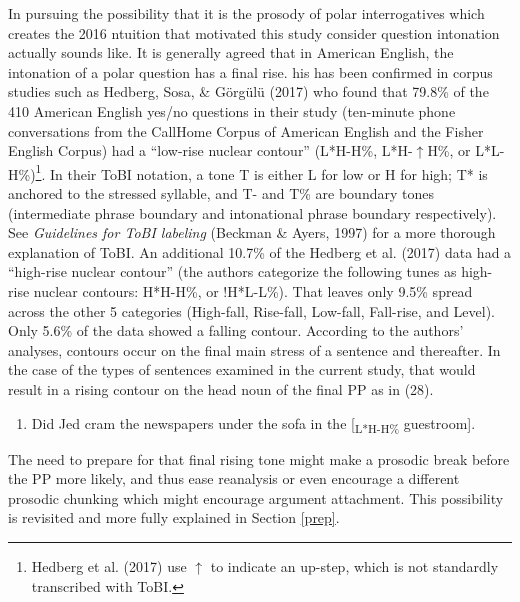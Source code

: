 \documentclass[12pt,oneside]{book}
\providecommand{\tightlist}{%
  \setlength{\itemsep}{0pt}\setlength{\parskip}{0pt}}
\let\rmarkdownfootnote\footnote%
\def\footnote{\protect\rmarkdownfootnote}
\begin{document}
In pursuing the possibility that it is the  prosody of polar interrogatives which creates the 2016 ntuition that motivated this study  consider  question intonation actually sounds like. It is generally agreed that in American English, the intonation of a polar question has  a final rise. his has been confirmed in corpus studies such as Hedberg, Sosa, \& Görgülü (2017) who found that 79.8\% of the 410 American English yes/no questions in their study (ten-minute phone conversations from the CallHome Corpus of American English and the Fisher English Corpus) had a ``low-rise nuclear contour'' (L*H-H\%, L*H-\(\uparrow\)H\%, or L*L-H\%)\footnote{Hedberg et al. (2017) use \(\uparrow\) to indicate an up-step, which is not standardly transcribed with ToBI.}. In their ToBI notation, a tone T is  either L for low or H for high; T* is anchored to the stressed syllable, and T- and T\% are boundary tones (intermediate phrase boundary and intonational phrase boundary respectively). See \emph{Guidelines for ToBI labeling} (Beckman \& Ayers, 1997) for a more thorough explanation of ToBI. An additional 10.7\% of the Hedberg et al. (2017) data had a ``high-rise nuclear contour'' (the authors categorize the following tunes as high-rise nuclear contours: H*H-H\%, or !H*L-L\%). That leaves only 9.5\% spread across the other 5 categories (High-fall, Rise-fall, Low-fall, Fall-rise, and Level). Only 5.6\% of the  data showed a falling contour. According to the authors' analyses,  contours occur on the final main stress of a sentence and thereafter. In the case of the types of sentences examined in the current study, that would result in a rising contour on the head noun of the final PP as in (28).

\begin{enumerate}
\def\labelenumi{(\arabic{enumi})}
\setcounter{enumi}{27}
\tightlist
\item
  Did Jed cram the newspapers under the sofa in the {[}\textsubscript{L*H-H\%} guestroom{]}.
\end{enumerate}

The need to prepare for that final rising tone might make a prosodic break before the PP more likely, and thus ease reanalysis or even encourage a different prosodic chunking which might encourage argument attachment. This  possibility is revisited and more fully explained in Section \ref{prep}.
\end{document}
